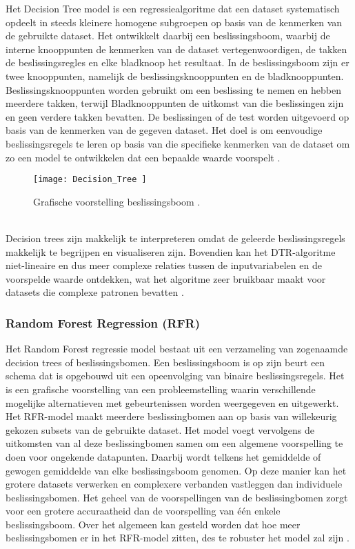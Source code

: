 Het Decision Tree model is een regressiealgoritme dat een dataset systematisch opdeelt in steeds kleinere homogene subgroepen op basis van de kenmerken van de gebruikte dataset. Het ontwikkelt daarbij een beslissingsboom, waarbij de interne knooppunten de kenmerken van de dataset vertegenwoordigen, de takken de beslissingsregles en elke bladknoop het resultaat. In de beslissingsboom zijn er twee knooppunten, namelijk de beslissingsknooppunten en de bladknooppunten. Beslissingsknooppunten worden gebruikt om een beslissing te nemen en hebben meerdere takken, terwijl Bladknooppunten de uitkomst van die beslissingen zijn en geen verdere takken bevatten.
De beslissingen of de test worden uitgevoerd op basis van de kenmerken van de gegeven dataset. Het doel is om eenvoudige beslissingsregels te leren op basis van die specifieke kenmerken van de dataset om zo een model te ontwikkelen dat een bepaalde waarde voorspelt  \autocite{Balakumar2023}.  
\\
\begin{figure}[h!]
    \centering\texttt{[image: Decision\_Tree ]}
    \caption{\label{fig:Decision_Tree}Grafische voorstelling beslissingsboom \autocite{Alessandro2021}.}
\end{figure} 
\\

Decision trees zijn makkelijk te interpreteren omdat de geleerde beslissingsregels makkelijk te begrijpen en visualiseren zijn. Bovendien kan het DTR-algoritme niet-lineaire en dus meer complexe relaties tussen de inputvariabelen en de voorspelde waarde ontdekken, wat het algoritme zeer bruikbaar maakt voor datasets die complexe patronen bevatten  \autocite{Viswa2023}. 

\subsubsection{Random Forest Regression (RFR)}

Het Random Forest regressie model bestaat uit een verzameling van zogenaamde decision trees of beslissingsbomen. Een beslissingsboom is op zijn beurt een schema dat is opgebouwd uit een opeenvolging van binaire beslissingsregels. Het is een grafische voorstelling van een probleemstelling waarin verschillende mogelijke alternatieven met gebeurtenissen worden weergegeven en uitgewerkt. Het RFR-model maakt meerdere beslissingbomen aan op basis van willekeurig gekozen subsets van de gebruikte dataset. Het model voegt vervolgens de uitkomsten van al deze beslissingbomen samen om een algemene voorspelling te doen voor ongekende datapunten. Daarbij wordt telkens het gemiddelde of gewogen gemiddelde van elke beslissingsboom genomen. Op deze manier kan het grotere datasets verwerken en complexere verbanden vastleggen dan individuele beslissingsbomen. Het geheel van de voorspellingen van de beslissingbomen zorgt voor een grotere accuraatheid dan de voorspelling van één enkele beslissingsboom. Over het algemeen kan gesteld worden dat hoe meer beslissingsbomen er in het RFR-model zitten, des te robuster het model zal zijn \autocite{Balakumar2023}. \\

